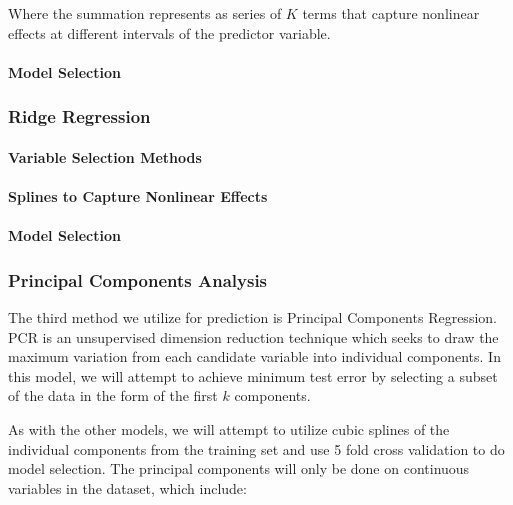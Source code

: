 \documentclass[
]{article}
\begin{document}
Where the summation represents as series of \(K\) terms that capture
nonlinear effects at different intervals of the predictor variable.

\hypertarget{model-selection}{%
\paragraph{Model Selection}\label{model-selection}}

\hypertarget{ridge-regression}{%
\subsubsection{Ridge Regression}\label{ridge-regression}}

\hypertarget{variable-selection-methods-1}{%
\paragraph{Variable Selection
Methods}\label{variable-selection-methods-1}}

\hypertarget{splines-to-capture-nonlinear-effects-1}{%
\paragraph{Splines to Capture Nonlinear
Effects}\label{splines-to-capture-nonlinear-effects-1}}

\hypertarget{model-selection-1}{%
\paragraph{Model Selection}\label{model-selection-1}}

\hypertarget{principal-components-analysis}{%
\subsubsection{Principal Components
Analysis}\label{principal-components-analysis}}

The third method we utilize for prediction is Principal Components
Regression. PCR is an unsupervised dimension reduction technique which
seeks to draw the maximum variation from each candidate variable into
individual components. In this model, we will attempt to achieve minimum
test error by selecting a subset of the data in the form of the first
\(k\) components.

As with the other models, we will attempt to utilize cubic splines of
the individual components from the training set and use 5 fold cross
validation to do model selection. The principal components will only be
done on continuous variables in the dataset, which include:
\end{document}
